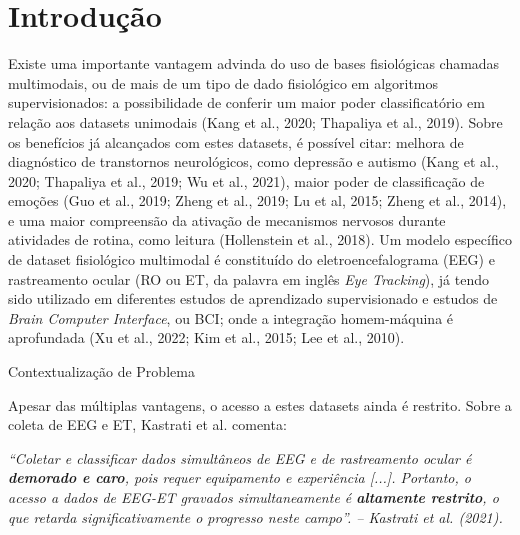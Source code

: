 \documentclass[a4paper, 12pt]{ppgeb}
\makeatletter
\renewcommand{\section}{\@startsection
{section}
{1}
{0mm}
{-\baselineskip}
{0.5\baselineskip}
{\large\bfseries\scshape}}
\makeatother
\begin{document}
\clearpage


\acresetall %

\chapter{Introdução}

Existe uma importante vantagem advinda do uso de bases fisiológicas chamadas multimodais, 
ou de mais de um tipo de dado fisiológico em algoritmos supervisionados: a possibilidade de conferir 
um maior poder classificatório em relação aos datasets unimodais (Kang et al., 2020; Thapaliya et al., 2019). 
Sobre os benefícios já alcançados com estes datasets, é possível citar: melhora de diagnóstico de transtornos 
neurológicos, como depressão e autismo (Kang et al., 2020; Thapaliya et al., 2019; Wu et al., 2021), 
maior poder de classificação de emoções (Guo et al., 2019; Zheng et al., 2019;  Lu et al, 2015; Zheng et al., 2014), 
e uma maior compreensão da ativação de mecanismos nervosos durante atividades de rotina, como leitura (Hollenstein et al., 2018). 
Um modelo específico de dataset fisiológico multimodal é constituído do eletroencefalograma (EEG) e
 rastreamento ocular (RO ou ET, da palavra em inglês \textit{Eye Tracking}), já tendo sido utilizado em diferentes estudos
 de aprendizado supervisionado e estudos de \textit{Brain Computer Interface}, ou BCI; onde a integração homem-máquina é aprofundada
 (Xu et al., 2022; Kim et al., 2015; Lee et al., 2010).


\section{Contextualização de Problema}

Apesar das múltiplas vantagens, o acesso a estes datasets ainda é restrito. Sobre a coleta de EEG e ET, 
Kastrati et al. comenta:

\textit{“Coletar e classificar dados simultâneos de EEG e de rastreamento ocular é \textbf{demorado e caro},
 pois requer equipamento e experiência [...]. 
 Portanto, o acesso a dados de EEG-ET gravados simultaneamente é \textbf{altamente restrito}, o que retarda significativamente o progresso neste campo”. – Kastrati et al. (2021).}
\end{document}
